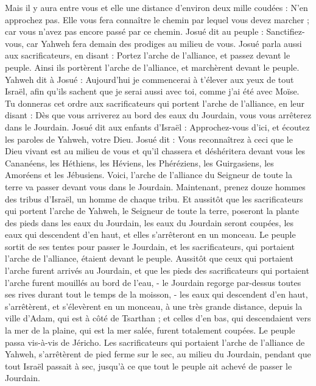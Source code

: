 \begin{multicols}{2}
Mais il y aura entre vous et elle une distance d’environ deux mille coudées : N’en approchez pas. Elle vous fera connaître le chemin par lequel vous devez marcher ; car vous n’avez pas encore passé par ce chemin.
Josué dit au peuple : Sanctifiez-vous, car Yahweh fera demain des prodiges au milieu de vous.
Josué parla aussi aux sacrificateurs, en disant : Portez l’arche de l’alliance, et passez devant le peuple. Ainsi ils portèrent l’arche de l’alliance, et marchèrent devant le peuple.
Yahweh dit à Josué : Aujourd’hui je commencerai à t’élever aux yeux de tout Israël, afin qu’ils sachent que je serai aussi avec toi, comme j’ai été avec Moïse.
Tu donneras cet ordre aux sacrificateurs qui portent l’arche de l’alliance, en leur disant : Dès que vous arriverez au bord des eaux du Jourdain, vous vous arrêterez dans le Jourdain.
Josué dit aux enfants d’Israël : Approchez-vous d’ici, et écoutez les paroles de Yahweh, votre Dieu.
Josué dit : Vous reconnaîtrez à ceci que le Dieu vivant est au milieu de vous et qu’il chassera et déshéritera devant vous les Cananéens, les Héthiens, les Héviens, les Phéréziens, les Guirgasiens, les Amoréens et les Jébusiens.
Voici, l’arche de l’alliance du Seigneur de toute la terre va passer devant vous dans le Jourdain.
Maintenant, prenez douze hommes des tribus d’Israël, un homme de chaque tribu.
Et aussitôt que les sacrificateurs qui portent l’arche de Yahweh, le Seigneur de toute la terre, poseront la plante des pieds dans les eaux du Jourdain, les eaux du Jourdain seront coupées, les eaux qui descendent d’en haut, et elles s’arrêteront en un monceau.
Le peuple sortit de ses tentes pour passer le Jourdain, et les sacrificateurs, qui portaient l’arche de l’alliance, étaient devant le peuple.
Aussitôt que ceux qui portaient l’arche furent arrivés au Jourdain, et que les pieds des sacrificateurs qui portaient l’arche furent mouillés au bord de l’eau, - le Jourdain regorge par-dessus toutes ses rives durant tout le temps de la moisson, -
les eaux qui descendent d’en haut, s’arrêtèrent, et s’élevèrent en un monceau, à une très grande distance, depuis la ville d’Adam, qui est à côté de Tsarthan ; et celles d’en bas, qui descendaient vers la mer de la plaine, qui est la mer salée, furent totalement coupées. Le peuple passa vis-à-vis de Jéricho.
Les sacrificateurs qui portaient l’arche de l’alliance de Yahweh, s’arrêtèrent de pied ferme sur le sec, au milieu du Jourdain, pendant que tout Israël passait à sec, jusqu’à ce que tout le peuple ait achevé de passer le Jourdain.

\end{multicols}
